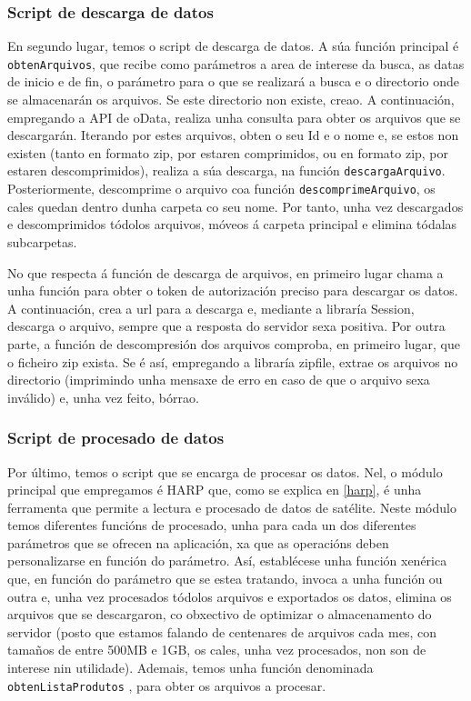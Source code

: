 \subsubsection{Script de descarga de datos}\label{descarga}
En segundo lugar, temos o script de descarga de datos. A súa función principal é \texttt{obtenArquivos}, que recibe como parámetros a area de interese da busca, as datas de inicio e de fin, o parámetro
para o que se realizará a busca e o directorio onde se almacenarán os arquivos. Se este directorio non existe, creao. A continuación, empregando a API de oData, realiza unha consulta para obter os
arquivos que se descargarán. Iterando por estes arquivos, obten o seu Id e o nome e, se estos non existen (tanto en formato zip, por estaren comprimidos, ou en formato zip, por estaren
descomprimidos), realiza a súa descarga, na función \texttt{descargaArquivo}. Posteriormente, descomprime o arquivo coa función \texttt{descomprimeArquivo}, os cales quedan dentro dunha carpeta co seu
nome. Por tanto, unha vez descargados e descomprimidos tódolos arquivos, móveos á carpeta principal e elimina tódalas subcarpetas.

No que respecta á función de descarga de arquivos, en primeiro lugar chama a unha función para obter o token de autorización preciso para descargar os datos. A continuación, crea a url para a
descarga e, mediante a libraría Session, descarga o arquivo, sempre que a resposta do servidor sexa positiva. Por outra parte, a función de descompresión dos arquivos comproba, en primeiro lugar,
que o ficheiro zip exista. Se é así, empregando a libraría zipfile, extrae os arquivos no directorio (imprimindo unha mensaxe de erro en caso de que o arquivo sexa inválido) e, unha vez feito, bórrao.

\subsubsection{Script de procesado de datos}\label{procesado}
Por último, temos o script que se encarga de procesar os datos. Nel, o módulo principal que empregamos é HARP que, como se explica en \ref{harp}, é unha ferramenta que permite a
lectura e procesado de datos de satélite. Neste módulo temos diferentes funcións de procesado, unha para cada un dos diferentes parámetros que se ofrecen na aplicación, xa que as
operacións deben personalizarse en función do parámetro. Así, establécese unha función xenérica que, en función do parámetro que se estea tratando, invoca a unha función ou outra e,
unha vez procesados tódolos arquivos e exportados os datos, elimina os arquivos que se descargaron, co obxectivo de optimizar o almacenamento do servidor (posto que estamos falando de
centenares de arquivos cada mes, con tamaños de entre 500MB e 1GB, os cales, unha vez procesados, non son de interese nin utilidade). Ademais, temos unha función denominada \texttt{obtenListaProdutos}
, para obter os arquivos a procesar.

